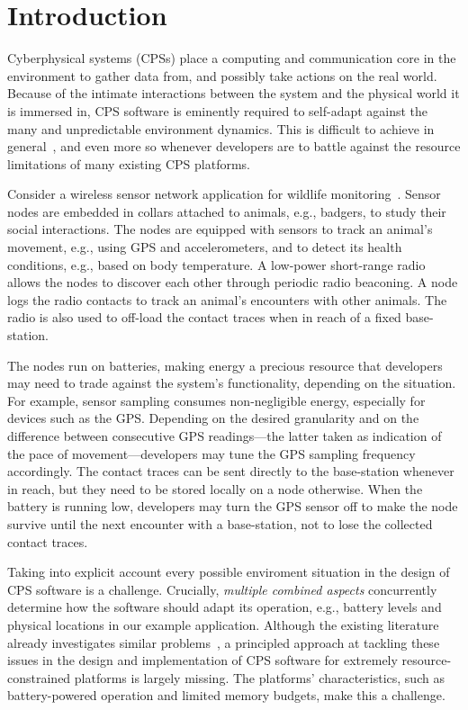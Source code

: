 \section{Introduction}

Cyberphysical systems (CPSs) place a computing and communication core
in the environment to gather data from, and possibly take actions on
the real world. Because of the intimate interactions between the
system and the physical world it is immersed in, CPS software is
eminently required to self-adapt against the many and unpredictable
environment dynamics. This is difficult to achieve in
general~\cite{cheng:adaptive}, and even more so whenever developers
are to battle against the resource limitations of many existing CPS
platforms.

 Consider a wireless sensor network application for
wildlife monitoring~\cite{pasztor10:selective}.  Sensor nodes are
embedded in collars attached to animals, e.g., badgers, to study their
social interactions. The nodes are equipped with sensors to track an
animal's movement, e.g., using GPS and accelerometers, and to detect
its health conditions, e.g., based on body temperature.  A low-power
short-range radio allows the nodes to discover each other through
periodic radio beaconing.  A node logs the radio contacts to track
an animal's encounters with other animals. The radio is also used to
off-load the contact traces when in reach of a fixed base-station.

The nodes run on batteries, making energy a precious resource that
developers may need to trade against the system's functionality,
depending on the situation. For example, sensor sampling consumes
non-negligible energy, especially for devices such as the
GPS. Depending on the desired granularity and on the difference
between consecutive GPS readings---the latter taken as indication of
the pace of movement---developers may tune the GPS sampling frequency
accordingly. The contact traces can be sent directly to the
base-station whenever in reach, but they need to be stored locally on
a node otherwise.  When the battery is running low, developers may
turn the GPS sensor off to make the node survive until the next
encounter with a base-station, not to lose the collected contact
traces.

 Taking into explicit account every
possible enviroment situation in the design of CPS software is a
challenge. Crucially, \emph{multiple combined aspects} concurrently
determine how the software should adapt its operation, e.g., battery
levels and physical locations in our example application. Although the
existing literature already investigates similar
problems~\cite{cheng:adaptive}, a principled approach at tackling
these issues in the design and implementation of CPS software for
extremely resource-constrained platforms is largely missing. The
platforms' characteristics, such as battery-powered operation and
limited memory budgets, make this a challenge.


